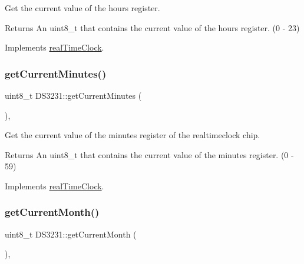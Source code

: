 Get the current value of the hours register. 

\begin{DoxyReturn}{Returns}
An uint8\+\_\+t that contains the current value of the hours register. (0 -\/ 23) 
\end{DoxyReturn}


Implements \mbox{\hyperlink{classreal_time_clock_a2861a9bc75466a762b4cd8ce37193247}{real\+Time\+Clock}}.

\mbox{\label{class_d_s3231_a08f384e1897214d4a201aaaecde3b8a4}} 
\subsubsection{\texorpdfstring{get\+Current\+Minutes()}{getCurrentMinutes()}}
{\footnotesize\ttfamily uint8\+\_\+t D\+S3231\+::get\+Current\+Minutes (\begin{DoxyParamCaption}{ }\end{DoxyParamCaption})\hspace{0.3cm}{\ttfamily [override]}, {\ttfamily [virtual]}}



Get the current value of the minutes register of the realtimeclock chip. 

\begin{DoxyReturn}{Returns}
An uint8\+\_\+t that contains the current value of the minutes register. (0 -\/ 59) 
\end{DoxyReturn}


Implements \mbox{\hyperlink{classreal_time_clock_a8436f171be03d35a931004b3f3b144e9}{real\+Time\+Clock}}.

\mbox{\label{class_d_s3231_a8d7a965802afacc16b4d5af86e0ed11e}} 
\subsubsection{\texorpdfstring{get\+Current\+Month()}{getCurrentMonth()}}
{\footnotesize\ttfamily uint8\+\_\+t D\+S3231\+::get\+Current\+Month (\begin{DoxyParamCaption}{ }\end{DoxyParamCaption})\hspace{0.3cm}{\ttfamily [override]}, {\ttfamily [virtual]}}



